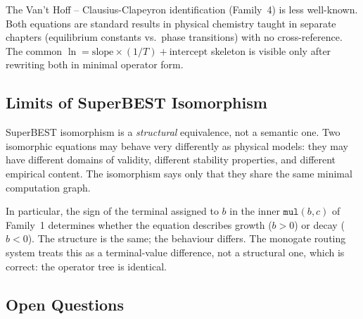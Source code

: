 \documentclass[12pt,a4paper]{article}
\theoremstyle{definition}
\newcommand{\mmul}{\mathtt{mul}}
\begin{document}
The Van't Hoff -- Clausius-Clapeyron identification (Family~4) is less
well-known.  Both equations are standard results in physical chemistry taught
in separate chapters (equilibrium constants vs.\ phase transitions) with no
cross-reference.  The common $\ln = \mathrm{slope} \times (1/T) + \mathrm{intercept}$
skeleton is visible only after rewriting both in minimal operator form.

\subsection{Limits of SuperBEST Isomorphism}

SuperBEST isomorphism is a \emph{structural} equivalence, not a semantic one.
Two isomorphic equations may behave very differently as physical models: they
may have different domains of validity, different stability properties, and
different empirical content.  The isomorphism says only that they share the
same minimal computation graph.

In particular, the sign of the terminal assigned to $b$ in the inner
$\mmul(b, c)$ of Family~1 determines whether the equation describes growth
($b > 0$) or decay ($b < 0$).  The structure is the same; the behaviour
differs.  The monogate routing system treats this as a terminal-value difference,
not a structural one, which is correct: the operator tree is identical.

\subsection{Open Questions}
\end{document}
